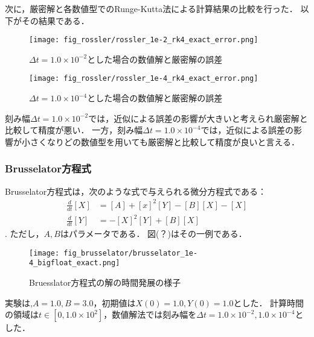 次に，厳密解と各数値型でのRunge-Kutta法による計算結果の比較を行った．
以下がその結果である．\\
\begin{figure}[H]
    \centering
    \begin{minipage}[b]{0.49\columnwidth}
        \centering
        \texttt{[image: fig\_rossler/rossler\_1e-2\_rk4\_exact\_error.png]}
        \caption{$\Delta t = 1.0 \times 10^{-2}$とした場合の数値解と厳密解の誤差}   
        \label{fig:rossler_1e-2_exact_error}
    \end{minipage}
    \begin{minipage}[b]{0.49\columnwidth}
        \centering
        \texttt{[image: fig\_rossler/rossler\_1e-4\_rk4\_exact\_error.png]}
        \caption{$\Delta t = 1.0 \times 10^{-4}$とした場合の数値解と厳密解の誤差}
        \label{fig:rossler_1e-4_exact_error}
    \end{minipage}
\end{figure}
刻み幅$\Delta t = 1.0 \times 10^{-2}$では，近似による誤差の影響が大きいと考えられ厳密解と比較して精度が悪い．
一方，刻み幅$\Delta t = 1.0 \times 10^{-4}$では，近似による誤差の影響が小さくなりどの数値型を用いても厳密解と比較して精度が良いと言える．

\subsubsection{Brusselator方程式}
Brusselator方程式は，次のような式で与えられる微分方程式である：
\begin{align}
    \frac{d}{dt}[X] &= [A] + [x]^2[Y] - [B][X] - [X]\\
    \frac{d}{dt}[Y] &= -[X]^2[Y] + [B][X]
\end{align}.
ただし，$A,B$はパラメータである．
図(？)はその一例である．
\begin{figure}[H]
    \centering
    \begin{minipage}[b]{0.9\columnwidth}
            \texttt{[image: fig\_brusselator/brusselator\_1e-4\_bigfloat\_exact.png]}
    \end{minipage}
    \caption{Bruesslator方程式の解の時間発展の様子}
\end{figure}
実験は,$A=1.0, B=3.0$，初期値は$X(0) = 1.0, Y(0) = 1.0$とした．
計算時間の領域は$t \in [0,1.0 \times 10^2]$，数値解法では刻み幅を$\Delta t =  1.0 \times 10^{-2},1.0 \times 10^{-4}$とした．
